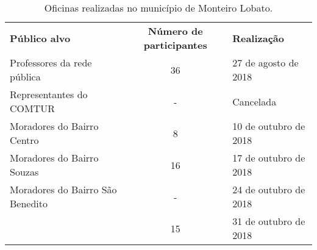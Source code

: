 \begin{table}[htbp]
  \centering
  \caption{Oficinas realizadas no município de Monteiro Lobato.}
    \begin{tabular}{P{17.82em}cP{12.68em}}
	 \textcolor[rgb]{ 1,  1,  1}{\textbf{Público alvo}} & \textcolor[rgb]{ 1,  1,  1}{\textbf{Número de participantes}} & \textcolor[rgb]{ 1,  1,  1}{\textbf{Realização}} \\
	 Professores da rede pública & 36    & 27 de agosto de 2018 \\
	 Representantes do COMTUR & - & Cancelada \\
	 Moradores do Bairro Centro & 8     & 10 de outubro de 2018 \\
	 Moradores do Bairro Souzas & 16    & 17 de outubro de 2018 \\
	 Moradores do Bairro São Benedito & - & 24 de outubro de 2018 \\ 
	  & 15  & 31 de outubro de 2018 \\
    \end{tabular}%
  \label{tab:oficinas}%
\end{table}%
